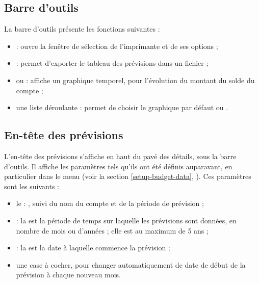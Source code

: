 \subsection{Barre d'outils\label{budget-estimate-functions}}

La barre d'outils présente les fonctions suivantes  : 
\begin{itemize}
	 \item {} : ouvre la fenêtre de sélection de l'imprimante et de ses options ;
	 \item {} : permet d'exporter le tableau des prévisions dans un fichier ;
	 \item {} ou  : affiche un graphique temporel, pour l'évolution du montant du solde du compte ;
	 \item une liste déroulante : permet de choisir le graphique par défaut  ou .	 
\end{itemize}


\subsection{En-tête des prévisions\label{budget-estimate-summary}}

L'en-tête des prévisions s'affiche en haut du pavé des détails, sous la barre d'outils. Il affiche les paramètres tels qu'ils ont été définis auparavant, en particulier dans le menu  (voir la section \vref{setup-budget-data}, ). Ces paramètres sont les suivants :
\begin{itemize}
	\item le   : , suivi du nom du compte et de la période de prévision ;
	\item {} : la  est la période de temps sur laquelle les prévisions sont données, en nombre de mois ou d'années ; elle est au maximum de 5 ans ;
	\item {} : la  est la date à laquelle commence la prévision ;
	\item une case à cocher, pour changer automatiquement de date de début de la prévision à chaque nouveau mois.
\end{itemize}


